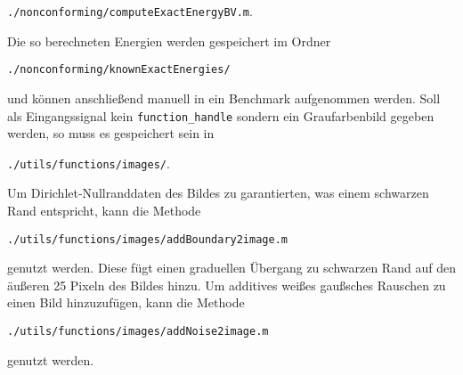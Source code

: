 \begin{center}
  \texttt{./nonconforming/computeExactEnergyBV.m}.
\end{center}
Die so berechneten Energien werden gespeichert im Ordner
\begin{center}
  \texttt{./nonconforming/knownExactEnergies/}
\end{center}
und können anschließend manuell in ein Benchmark aufgenommen werden.
Soll als Eingangssignal kein \texttt{function\_handle} sondern ein
Graufarbenbild gegeben werden, so muss es gespeichert sein in 
\begin{center}
  \texttt{./utils/functions/images/}.
\end{center}
Um Dirichlet-Nullranddaten des Bildes zu garantierten, was einem schwarzen Rand
entspricht, kann die Methode 
\begin{center}
  \texttt{./utils/functions/images/addBoundary2image.m}
\end{center}
genutzt werden. Diese fügt einen graduellen Übergang zu schwarzen Rand auf den 
äußeren 25 Pixeln des Bildes hinzu.
Um additives weißes gaußsches Rauschen zu einen Bild hinzuzufügen, kann die
Methode
\begin{center}
  \texttt{./utils/functions/images/addNoise2image.m}
\end{center}
genutzt werden. 

